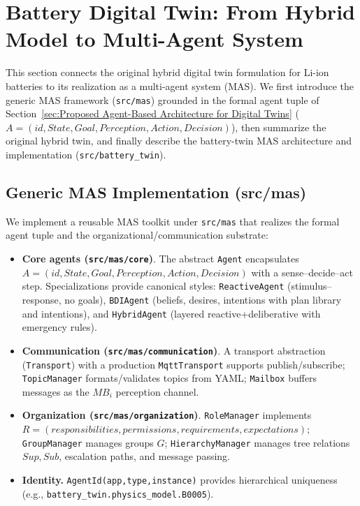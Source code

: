 \section{Battery Digital Twin: From Hybrid Model to Multi-Agent System}
\label{sec:battery-twin-mas}

This section connects the original hybrid digital twin formulation for Li-ion batteries to its realization as a multi-agent system (MAS). We first introduce the generic MAS framework (\texttt{src/mas}) grounded in the formal agent tuple of Section~\ref{sec:Proposed Agent-Based Architecture for Digital Twins} ($A=(id,State,Goal,Perception,Action,Decision)$), then summarize the original hybrid twin, and finally describe the battery-twin MAS architecture and implementation (\texttt{src/battery\_twin}).



\subsection{Generic MAS Implementation (src/mas)}
\label{subsec:generic-mas-impl}

We implement a reusable MAS toolkit under \texttt{src/mas} that realizes the formal agent tuple and the organizational/communication substrate:

\begin{itemize}
  \item \textbf{Core agents (\texttt{src/mas/core})}. The abstract \texttt{Agent} encapsulates $A=(id,State,Goal,Perception,Action,Decision)$ with a sense–decide–act step. Specializations provide canonical styles: \texttt{ReactiveAgent} (stimulus–response, no goals), \texttt{BDIAgent} (beliefs, desires, intentions with plan library and intentions), and \texttt{HybridAgent} (layered reactive+deliberative with emergency rules).
  \item \textbf{Communication (\texttt{src/mas/communication})}. A transport abstraction (\texttt{Transport}) with a production \texttt{MqttTransport} supports publish/subscribe; \texttt{TopicManager} formats/validates topics from YAML; \texttt{Mailbox} buffers messages as the $MB_i$ perception channel.
  \item \textbf{Organization (\texttt{src/mas/organization})}. \texttt{RoleManager} implements $R=(responsibilities,permissions,requirements,expectations)$; \texttt{GroupManager} manages groups $G$; \texttt{HierarchyManager} manages tree relations $Sup,Sub$, escalation paths, and message passing.
  \item \textbf{Identity.} \texttt{AgentId(app,type,instance)} provides hierarchical uniqueness (e.g., \texttt{battery\_twin.physics\_model.B0005}).
\end{itemize}

